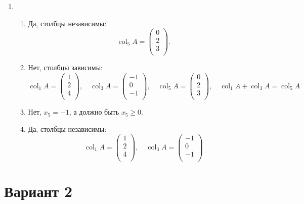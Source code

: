 \documentclass[12pt]{article}
\DeclareMathOperator{\col}{col}
\begin{document}
\begin{enumerate}
\item 
\begin{enumerate}
  \item Да, столбцы независимы:
  \[
  \col_5 A = \begin{pmatrix}
    0 \\ 
    2 \\ 
    3 \\
  \end{pmatrix}.
  \]
  \item Нет, столбцы зависимы:
  \[
  \col_1 A = \begin{pmatrix}
    1 \\
    2 \\
    4 \\
  \end{pmatrix}, \quad 
  \col_3 A = \begin{pmatrix}
    -1 \\
    0 \\
    -1 \\
  \end{pmatrix}, \quad 
  \col_5 A = \begin{pmatrix}
    0 \\ 
    2 \\ 
    3 \\
  \end{pmatrix}, \quad 
  \col_1 A + \col_3 A = \col_5 A
  \]
  \item Нет, $x_5  = -1$, а должно быть $x_5 \geq 0$. 
  \item Да, столбцы независимы:
  \[
    \col_1 A = \begin{pmatrix}
      1 \\
      2 \\
      4 \\
    \end{pmatrix}, \quad 
    \col_3 A = \begin{pmatrix}
      -1 \\
      0 \\
      -1 \\
    \end{pmatrix}
  \]

\end{enumerate}



\end{enumerate}

\section*{Вариант 2}
\end{document}
